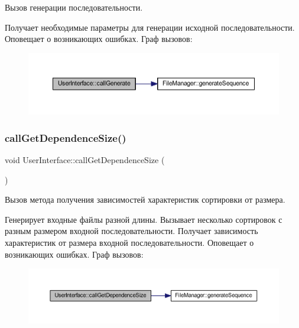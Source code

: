 Вызов генерации последовательности. 

Получает необходимые параметры для генерации исходной последовательности. Оповещает о возникающих ошибках. Граф вызовов\+:\nopagebreak
\begin{figure}[H]
\begin{center}
\leavevmode
\includegraphics[width=350pt]{class_user_interface_a27c547dadfd5588d5b734e253b2e8a4a_cgraph}
\end{center}
\end{figure}
\hypertarget{class_user_interface_a1dc307f92c919866f13ddaf30cde1a70}{}\label{class_user_interface_a1dc307f92c919866f13ddaf30cde1a70} 
\subsubsection{\texorpdfstring{call\+Get\+Dependence\+Size()}{callGetDependenceSize()}}
{\footnotesize\ttfamily void User\+Interface\+::call\+Get\+Dependence\+Size (\begin{DoxyParamCaption}{ }\end{DoxyParamCaption})\hspace{0.3cm}{\ttfamily [private]}}



Вызов метода получения зависимостей характеристик сортировки от размера. 

Генерирует входные файлы разной длины. Вызывает несколько сортировок с разным размером входной последовательности. Получает зависимость характеристик от размера входной последовательности. Оповещает о возникающих ошибках. Граф вызовов\+:\nopagebreak
\begin{figure}[H]
\begin{center}
\leavevmode
\includegraphics[width=350pt]{class_user_interface_a1dc307f92c919866f13ddaf30cde1a70_cgraph}
\end{center}
\end{figure}
\hypertarget{class_user_interface_ab668f3b2d9f89ce3eacda5e166f33807}{}\label{class_user_interface_ab668f3b2d9f89ce3eacda5e166f33807} 
